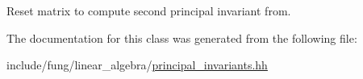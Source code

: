 Reset matrix to compute second principal invariant from. 



The documentation for this class was generated from the following file\-:\begin{DoxyCompactItemize}
\item 
include/fung/linear\-\_\-algebra/\hyperlink{principal__invariants_8hh}{principal\-\_\-invariants.\-hh}\end{DoxyCompactItemize}
